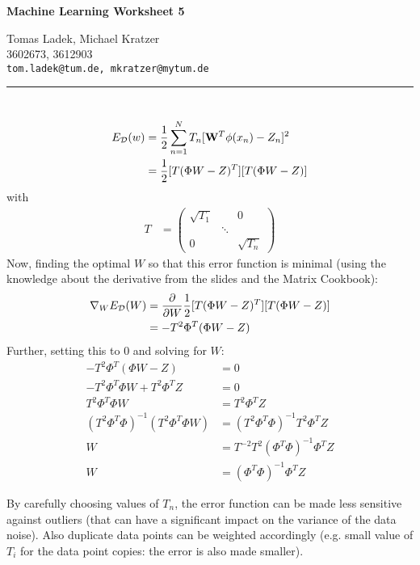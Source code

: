 \documentclass[11pt]{article}
\makeatletter
\newcommand{\exercise}{\section{}}
\newcommand{\hwhead}[4]{
\begin{center}
\sffamily\large\bfseries Machine Learning Worksheet #1
\vspace{2mm}
\normalfont

#2\\
#3\\
\texttt{#4}
\end{center}
\vspace{6mm} \hrule \vspace{4mm}
}
\newcommand{\names}{Tomas Ladek, Michael Kratzer} %
\newcommand{\imats}{3602673, 3612903} %
\newcommand{\emails}{tom.ladek@tum.de, mkratzer@mytum.de} %
\makeatother
\begin{document}
\hwhead{5}{\names}{\imats}{\emails}


\exercise
\begin{align*}
	E_{\cal D}(w) &= \dfrac{1}{2} \sum_{n=1}^N T_n [\mathbf{W}^T \phi(x_n) - Z_n]^2\\
	&= \dfrac{1}{2} [T (\Phi W - Z)^T] [T (\Phi W - Z)]
\end{align*}
with
\begin{align*}
	T &= 
	\begin{pmatrix}
	\sqrt{T_1} & & 0 \\
	 & \ddots & \\
	 0 & & \sqrt{T_n}
	\end{pmatrix}
\end{align*}
Now, finding the optimal $W$ so that this error function is minimal (using the knowledge about the derivative from the slides and the Matrix Cookbook):
\begin{align*}
	\nabla_W E_{\cal D}(W) &= \dfrac{\partial}{\partial W} \dfrac{1}{2} [T (\Phi W - Z)^T] [T (\Phi W - Z)] \\
	&= - T^2 \Phi^T (\Phi W - Z)
\end{align*}
Further, setting this to $0$ and solving for $W$:
\begin{align*}
	- T^2 \Phi^T (\Phi W - Z) &= 0 \\
	- T^2 \Phi^T \Phi W + T^2 \Phi^T Z &= 0 \\
	T^2 \Phi^T \Phi W &= T^2 \Phi^T Z \\
	(T^2 \Phi^T \Phi)^{-1} (T^2 \Phi^T \Phi W) &= (T^2 \Phi^T \Phi)^{-1} T^2 \Phi^T Z \\
	W &= T^{-2} T^2 (\Phi^T \Phi)^{-1} \Phi^T Z \\
	W &= (\Phi^T \Phi)^{-1} \Phi^T Z	
\end{align*}

By carefully choosing values of $T_n$, the error function can be made less sensitive against outliers (that can have a significant impact on the variance of the data noise). Also duplicate data points can be weighted accordingly (e.g. small value of $T_i$ for the data point copies: the error is also made smaller).

\exercise
\end{document}
